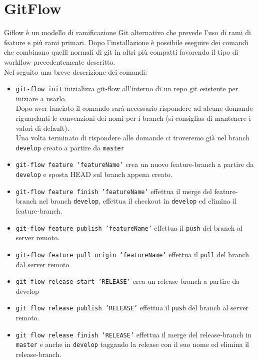 \documentclass[12pt, a4paper]{article}
\begin{document}
\section{GitFlow}
Giflow è un modello di ramificazione Git alternativo che prevede l'uso di rami di feature e più rami primari. Dopo l'installazione è possibile eseguire dei comandi che combinano quelli normali di git in altri più compatti favorendo il tipo di workflow precedentemente descritto.\\
Nel seguito una breve descrizione dei comandi:
\begin{itemize}
    \item[] \texttt{git-flow init} inizializza git-flow all'interno di un repo git esistente per iniziare a usarlo.\\
    Dopo aver lanciato il comando sarà necessario rispondere ad alcune domande riguardanti le convenzioni dei nomi per i branch (si consiglias di mantenere i valori di default).\\
    Una volta terminato di rispondere alle domande ci troveremo già nel branch \texttt{develop} creato a partire da \texttt{master}
    \item[] \texttt{git-flow feature 'featureName'} crea un nuovo feature-branch a partire da \texttt{develop} e sposta HEAD sul branch appena creato.
    \item[] \texttt{git-flow feature finish 'featureName'} effettua il merge del feature-branch nel branch \texttt{develop}, effettua il checkout in \texttt{develop} ed elimina il feature-branch.
    \item[] \texttt{git-flow feature publish 'featureName'} effettua il \texttt{push} del branch al server remoto.
    \item[] \texttt{git-flow feature pull origin 'featureName'} effettua il \texttt{pull} del branch dal server remoto
    \item[] \texttt{git flow release start 'RELEASE'} crea un release-branch a partire da develop
    \item[] \texttt{git flow release publish 'RELEASE'} effettua il \texttt{push} del branch al server remoto.
    \item[] \texttt{git flow release finish 'RELEASE'} effettua il merge del release-branch in \texttt{master} e anche in \texttt{develop} taggando la release con il suo nome ed elimina il release-branch.
\end{itemize}

\end{document}
